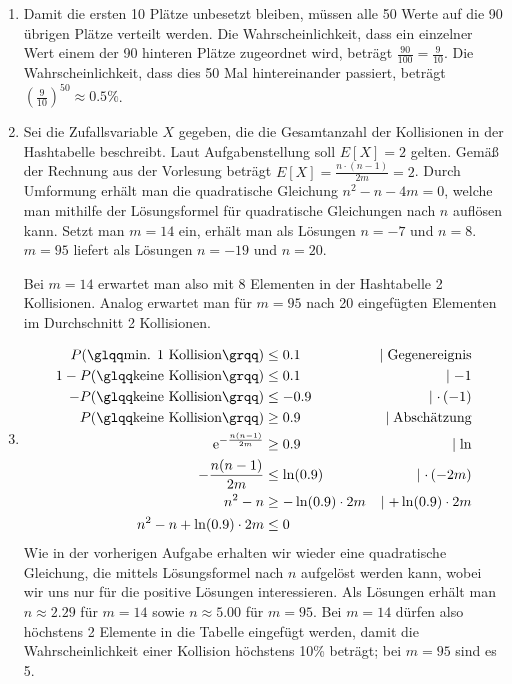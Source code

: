 \documentclass[11pt,a4paper]{article}
\begin{document}
\begin{loesung}
    \begin{enumerate}
        \item Damit die ersten 10 Plätze unbesetzt bleiben, müssen alle 50 Werte auf die 90 übrigen Plätze verteilt werden.
        Die Wahrscheinlichkeit, dass ein einzelner Wert einem der 90 hinteren Plätze zugeordnet wird, beträgt $\frac{90}{100} = \frac{9}{10}$.
        Die Wahrscheinlichkeit, dass dies 50 Mal hintereinander passiert, beträgt $\left(\frac{9}{10}\right)^{50} \approx 0.5\%$.

        \item Sei die Zufallsvariable $X$ gegeben, die die Gesamtanzahl der Kollisionen in der Hashtabelle beschreibt. 
        Laut Aufgabenstellung soll $E[X] = 2$ gelten.
        Gemäß der Rechnung aus der Vorlesung beträgt $E[X] = \frac{n \cdot (n - 1)}{2m} = 2$.
        Durch Umformung erhält man die quadratische Gleichung $n^2 - n - 4m = 0$, welche man mithilfe der Lösungsformel für quadratische Gleichungen nach $n$ auflösen kann.
        Setzt man $m = 14$ ein, erhält man als Lösungen $n = -7$ und $n = 8$.
        $m = 95$ liefert als Lösungen $n = -19$ und $n = 20$.

        Bei $m = 14$ erwartet man also mit 8 Elementen in der Hashtabelle 2 Kollisionen.
        Analog erwartet man für $m = 95$ nach 20 eingefügten Elementen im Durchschnitt 2 Kollisionen.
        
        \item
        \begin{align*}
            P(\text{\quotes{min. 1 Kollision}}) &\leq 0.1 & \mid \text{Gegenereignis}\\
            1 - P(\text{\quotes{keine Kollision}}) &\leq 0.1 & \mid -1\\
            - P(\text{\quotes{keine Kollision}}) &\leq -0.9 & \mid \cdot\,(-1)\\
            P(\text{\quotes{keine Kollision}}) &\geq 0.9 & \mid \text{Abschätzung}\\
            \mathrm{e}^{-\frac{n (n - 1)}{2m}} &\geq 0.9 & \mid \ln\\
            -\frac{n (n - 1)}{2m} &\leq \ln(0.9) & \mid \cdot \,(-2m) \\
            n^2 - n &\geq -\ln(0.9) \cdot 2m & \mid + \ln(0.9) \cdot 2m\\
            n^2 - n + \ln(0.9) \cdot 2m &\leq 0 
        \end{align*}
        Wie in der vorherigen Aufgabe erhalten wir wieder eine quadratische Gleichung, die mittels Lösungsformel nach $n$ aufgelöst werden kann, wobei wir uns nur für die positive Lösungen interessieren.
        Als Lösungen erhält man $n \approx 2.29$ für $m = 14$ sowie $n \approx 5.00$ für $m = 95$.
        Bei $m = 14$ dürfen also höchstens 2 Elemente in die Tabelle eingefügt werden, damit die Wahrscheinlichkeit einer Kollision höchstens 10\% beträgt; bei $m = 95$ sind es 5.


\end{enumerate}
\end{loesung}
\end{document}
